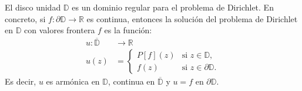 \begin{theorem}
    El disco unidad $\mathbb{D}$ es un dominio regular para el problema de Dirichlet.
    En concreto, si $f: \partial\mathbb{D} \to \mathbb{R}$ es continua, entonces la solución del problema de Dirichlet en $\mathbb{D}$ con valores frontera $f$ es la función:
    \begin{align*}
        u: \overline{\mathbb{D}} & \to \mathbb{R}                                   \\
        u(z)                     & = \begin{cases}
                                         P[f](z) & \text{si } z \in \mathbb{D},         \\
                                         f(z)    & \text{si } z \in \partial\mathbb{D}.
                                     \end{cases}
    \end{align*}
    Es decir, $u$ es armónica en $\mathbb{D}$, continua en $\overline{\mathbb{D}}$ y $u = f$ en $\partial\mathbb{D}$.
\end{theorem}

